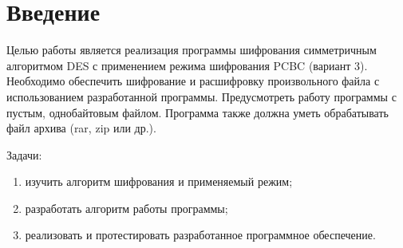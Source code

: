 \section*{Введение}

Целью работы является реализация программы шифрования симметричным алгоритмом
DES с применением режима шифрования PCBC (вариант 3). Необходимо обеспечить
шифрование и расшифровку произвольного файла с использованием разработанной
программы. Предусмотреть работу программы с пустым, однобайтовым файлом.
Программа также должна уметь обрабатывать файл архива (rar, zip или др.).

Задачи:
\begin{enumerate}
    \item изучить алгоритм шифрования и применяемый режим;
    \item разработать алгоритм работы программы;
    \item реализовать и протестировать разработанное программное обеспечение.
\end{enumerate}

\pagebreak

